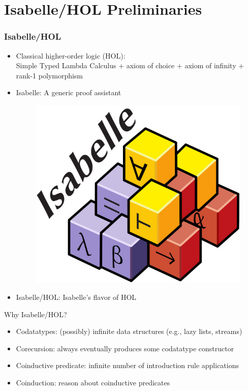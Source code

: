 \documentclass[fleqn,aspectratio=169,10pt]{beamer}
\begin{document}
\section{Isabelle/HOL Preliminaries}

\begin{frame}[fragile]
  \frametitle{Isabelle/HOL}
  \begin{itemize}
    \item Classical higher-order logic (HOL):\\ Simple Typed Lambda Calculus + axiom of choice + axiom of infinity + rank-1 polymorphism
          \pause
    \item Isabelle: A generic proof assistant
          \begin{overlayarea}{\textwidth}{.3\textheight}
            \centering
            \begin{figure}
              \centering
              \includegraphics[scale=0.15]{isabelle}
            \end{figure}
          \end{overlayarea}
    \item Isabelle/HOL: Isabelle's flavor of HOL
  \end{itemize}
  \pause
    \begin{block}{Why Isabelle/HOL?}
      \begin{itemize}
        \item Codatatypes: (possibly) infinite data structures (e.g., lazy lists, streams)
        \item Corecursion: always eventually produces some codatatype constructor
        \item Coinductive predicate: infinite number of introduction rule applications
        \item Coinduction: reason about coinductive predicates
      \end{itemize}
  \end{block}

\end{frame}
\end{document}
